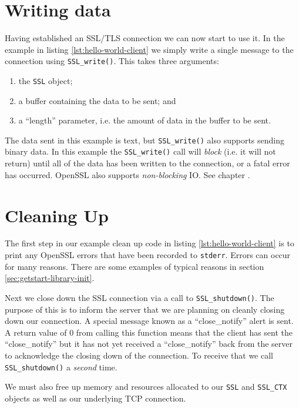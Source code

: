 \section{Writing data}

Having established an SSL/TLS connection we can now start to use it. In the 
example in listing \ref{lst:hello-world-client} we simply write a single 
message to the connection using \verb!SSL_write()!. This takes three arguments:
\begin{enumerate}
\item the \texttt{SSL} object;
\item a buffer containing the data to be sent; and
\item a ``length'' parameter, i.e. the amount of data in the buffer to be sent.
\end{enumerate}

The data sent in this example is text, but \verb!SSL_write()! also supports 
sending binary data. In this example the \verb!SSL_write()! call will
\emph{block} (i.e. it will not return) until all of the data has been written
to the connection, or a fatal error has occurred. OpenSSL also supports
\emph{non-blocking} IO. See chapter .

\section{Cleaning Up}

The first step in our example clean up code in listing
\ref{lst:hello-world-client} is to print any OpenSSL errors that have been 
recorded to \verb!stderr!. Errors can occur for many reasons. There are some
examples of typical reasons in section \ref{sec:getstart-library-init}.

Next we close down the SSL connection via a call to \verb!SSL_shutdown()!. The 
purpose of this is to inform the server that we are planning on cleanly closing 
down our connection. A special message known as a ``close\_notify'' alert is 
sent. A return value of 0 from calling this function means that the client has 
sent the ``close\_notify'' but it has not yet received a ``close\_notify'' back 
from the server to acknowledge the closing down of the connection. To receive 
that we call \verb!SSL_shutdown()! a \emph{second} time.

We must also free up memory and resources allocated to our \verb!SSL! and
\verb!SSL_CTX! objects as well as our underlying TCP connection.


